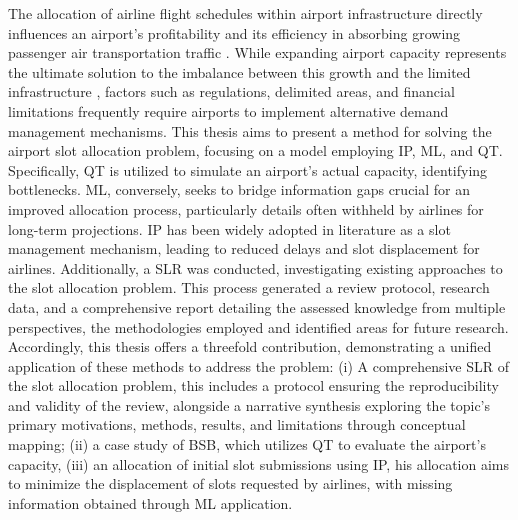 The allocation of airline flight schedules within airport infrastructure directly influences an airport's profitability and its efficiency in absorbing growing passenger air transportation traffic \cite{ACIWorldInsights_WhyAirportSlotsMatter}. While expanding airport capacity represents the ultimate solution to the imbalance between this growth and the limited infrastructure \cite{IATA_WorldwideAirportSlotsFactSheet}, factors such as regulations, delimited areas, and financial limitations frequently require airports to implement alternative demand management mechanisms.
This thesis aims to present a method for solving the airport slot allocation problem, focusing on a model employing \acrfull{IP}, \acrfull{ML}, and \acrfull{QT}. Specifically, \acrshort{QT} is utilized to simulate an airport's actual capacity, identifying bottlenecks. \acrshort{ML}, conversely, seeks to bridge information gaps crucial for an improved allocation process, particularly details often withheld by airlines for long-term projections. \acrshort{IP} has been widely adopted in literature as a slot management mechanism, leading to reduced delays and slot displacement for airlines.
Additionally, a \acrfull{SLR} was conducted, investigating existing approaches to the slot allocation problem. This process generated a review protocol, research data, and a comprehensive report detailing the assessed knowledge from multiple perspectives, the methodologies employed and identified areas for future research.
Accordingly, this thesis offers a threefold contribution, demonstrating a unified application of these methods to address the problem: (i) A comprehensive \acrshort{SLR} of the slot allocation problem, this includes a protocol ensuring the reproducibility and validity of the review, alongside a narrative synthesis exploring the topic's primary motivations, methods, results, and limitations through conceptual mapping; (ii) a case study of \acrfull{BSB}, which utilizes \acrshort{QT} to evaluate the airport's capacity, (iii) an allocation of initial slot submissions using \acrshort{IP}, his allocation aims to minimize the displacement of slots requested by airlines, with missing information obtained through \acrshort{ML} application.
